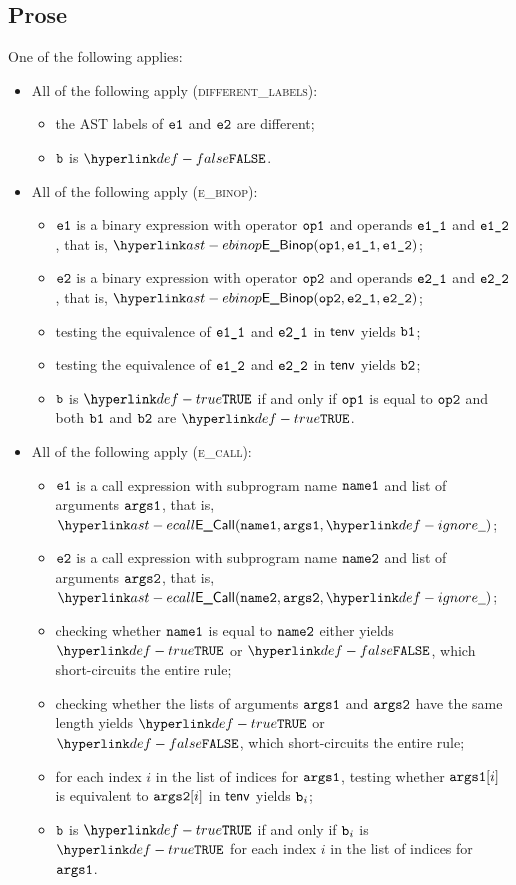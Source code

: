 \subsection{Prose}
One of the following applies:
\begin{itemize}
  \item All of the following apply (\textsc{different\_labels}):
  \begin{itemize}
    \item the AST labels of $\texttt{e1}$ and $\texttt{e2}$ are different;
    \item $\texttt{b}$ is $\False$.
  \end{itemize}

  \item All of the following apply (\textsc{e\_binop}):
  \begin{itemize}
    \item $\texttt{e1}$ is a binary expression with operator $\texttt{op1}$ and operands $\texttt{e1\_1}$ and $\texttt{e1\_2}$,
          that is, $\EBinop(\opone, \veoneone, \veonetwo)$;
    \item $\texttt{e2}$ is a binary expression with operator $\texttt{op2}$ and operands $\texttt{e2\_1}$ and $\texttt{e2\_2}$,
          that is, $\EBinop(\optwo, \vetwoone, \vetwotwo)$;
    \item testing the equivalence of $\texttt{e1\_1}$ and $\texttt{e2\_1}$ in $\textsf{tenv}$ yields $\texttt{b1}$\ProseOrTypeError;
    \item testing the equivalence of $\texttt{e1\_2}$ and $\texttt{e2\_2}$ in $\textsf{tenv}$ yields $\texttt{b2}$\ProseOrTypeError;
    \item $\texttt{b}$ is $\True$ if and only if $\texttt{op1}$ is equal to $\texttt{op2}$ and both $\texttt{b1}$ and $\texttt{b2}$ are $\True$.
  \end{itemize}

  \item All of the following apply (\textsc{e\_call}):
  \begin{itemize}
    \item $\texttt{e1}$ is a call expression with subprogram name $\texttt{name1}$ and list of arguments $\texttt{args1}$,
          that is, $\ECall(\nameone, \vargsone, \Ignore)$;
    \item $\texttt{e2}$ is a call expression with subprogram name $\texttt{name2}$ and list of arguments $\texttt{args2}$,
          that is, $\ECall(\nametwo, \vargstwo, \Ignore)$;
    \item checking whether $\texttt{name1}$ is equal to $\texttt{name2}$ either yields $\True$ or $\False$, which short-circuits the entire rule;
    \item checking whether the lists of arguments $\texttt{args1}$ and $\texttt{args2}$ have the same length yields
          $\True$ or $\False$, which short-circuits the entire rule;
    \item for each index $i$ in the list of indices for $\texttt{args1}$, testing whether $\texttt{args1}[i]$ is equivalent to $\texttt{args2}[i]$
          in $\textsf{tenv}$ yields $\texttt{b}_i$\ProseOrTypeError;
    \item $\texttt{b}$ is $\True$ if and only if $\texttt{b}_i$ is $\True$ for each index $i$ in the list of indices for $\texttt{args1}$.
  \end{itemize}


\end{itemize}
